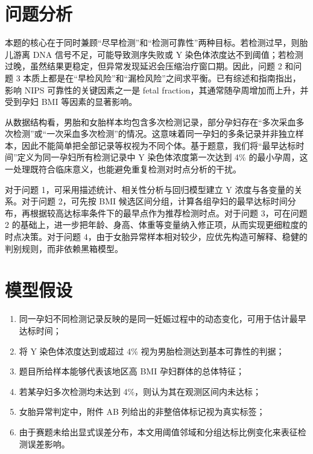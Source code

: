 ﻿\documentclass[12pt,a4paper]{article}
\begin{document}
\section{问题分析}
本题的核心在于同时兼顾“尽早检测”和“检测可靠性”两种目标。若检测过早，则胎儿游离 DNA 信号不足，可能导致测序失败或 Y 染色体浓度达不到阈值；若检测过晚，虽然结果更稳定，但异常发现延迟会压缩治疗窗口期。因此，问题 2 和问题 3 本质上都是在“早检风险”和“漏检风险”之间求平衡。已有综述和指南指出，影响 NIPS 可靠性的关键因素之一是 fetal fraction，其通常随孕周增加而上升，并受到孕妇 BMI 等因素的显著影响\cite{ref-leonard2017,ref-yared2016,ref-zhang2023,ref-reviewff2023}。

从数据结构看，男胎和女胎样本均包含多次检测记录，部分孕妇存在“多次采血多次检测”或“一次采血多次检测”的情况。这意味着同一孕妇的多条记录并非独立样本，因此不能简单把全部记录等权视为不同个体。基于题意，我们将“最早达标时间”定义为同一孕妇所有检测记录中 Y 染色体浓度第一次达到 4\% 的最小孕周，这一处理既符合临床意义，也能避免重复检测对时点分析的干扰。

对于问题 1，可采用描述统计、相关性分析与回归模型建立 Y 浓度与各变量的关系。对于问题 2，可先按 BMI 候选区间分组，计算各组孕妇的最早达标时间分布，再根据较高达标率条件下的最早点作为推荐检测时点。对于问题 3，可在问题 2 的基础上，进一步把年龄、身高、体重等变量纳入修正项，从而实现更细粒度的时点决策。对于问题 4，由于女胎异常样本相对较少，应优先构造可解释、稳健的判别规则，而非依赖黑箱模型。

\section{模型假设}
\begin{enumerate}
    \item 同一孕妇不同检测记录反映的是同一妊娠过程中的动态变化，可用于估计最早达标时间；
    \item 将 Y 染色体浓度达到或超过 4\% 视为男胎检测达到基本可靠性的判据；
    \item 题目所给样本能够代表该地区高 BMI 孕妇群体的总体特征；
    \item 若某孕妇多次检测均未达到 4\%，则认为其在观测区间内未达标；
    \item 女胎异常判定中，附件 AB 列给出的非整倍体标记视为真实标签；
    \item 由于赛题未给出显式误差分布，本文用阈值邻域和分组达标比例变化来表征检测误差影响。
\end{enumerate}
\end{document}
